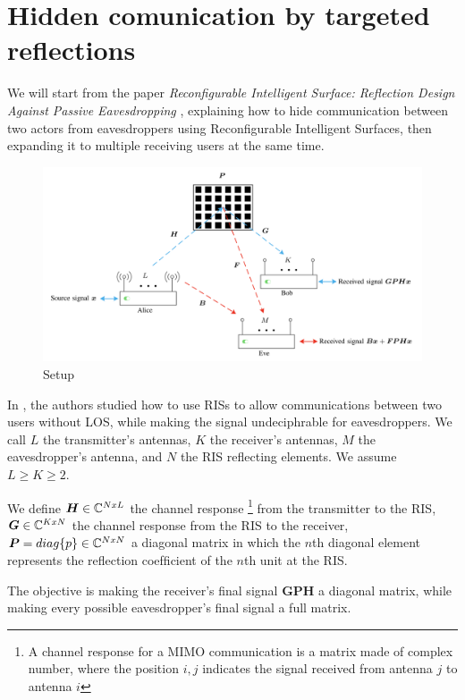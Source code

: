 \section{Hidden comunication by targeted reflections}

We will start from the paper \textit{Reconfigurable Intelligent Surface: Reflection Design Against Passive Eavesdropping} \cite{9328149}, explaining how to hide communication between two actors from eavesdroppers using Reconfigurable Intelligent Surfaces, then expanding it to multiple receiving users at the same time.

\begin{figure}[H]
  \centering
  \includegraphics[width=\linewidth]{imgs/problem-description.png}
  \caption{Setup}
  \label{fig:correlation_sk}
\end{figure}

In \cite{9328149}, the authors studied how to use RISs to allow communications between two users without LOS, while making the signal undeciphrable for eavesdroppers. We call $L$ the transmitter's antennas, $K$ the receiver's antennas, $M$ the eavesdropper's antenna, and $N$ the RIS reflecting elements. We assume $L \ge K \ge 2$.

We define $\bm{H} \in \mathbb{C}^{NxL}$ the channel response \footnote{A channel response for a MIMO communication is a matrix made of complex number, where the position $i,j$ indicates the signal received from antenna $j$ to antenna $i$} from the transmitter to the RIS, $\bm{G} \in \mathbb{C}^{KxN}$ the channel response from the RIS to the receiver, $\bm{P} = diag\{p\} \in \mathbb{C}^{NxN}$ a diagonal matrix in which the $n$th diagonal element represents the reﬂection coefﬁcient of the $n$th unit at the RIS.

The objective is making the receiver's final signal $\bm{GPH}$ a diagonal matrix, while making every possible eavesdropper's final signal a full matrix.

